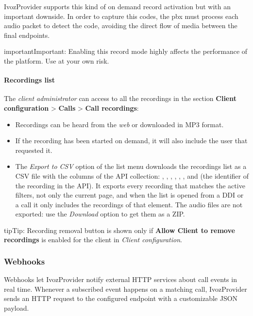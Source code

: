 \documentclass[letterpaper,10pt,english]{sphinxmanual}
\begin{document}
IvozProvider supports this kind of on demand record activation but with an
important downside. In order to capture this codes, the pbx must process each
audio packet to detect the code, avoiding the direct flow of media between the
final endpoints.

\begin{notice}{important}{Important:}
Enabling this record mode highly affects the performance of the
platform. Use at your own risk.
\end{notice}


\paragraph{Recordings list}
\label{administration_portal/client/vpbx/calls/call_recordings:recordings-list}
The \emph{client administrator} can access to all the recordings in the section
\textbf{Client configuration} \textgreater{} \textbf{Calls} \textgreater{} \textbf{Call recordings}:
\begin{itemize}
\item {} 
Recordings can be heard from the \emph{web} or downloaded in MP3 format.

\item {} 
If the recording has been started on demand, it will also include the user
that requested it.

\item {} 
The \emph{Export to CSV} option of the list menu downloads the recordings list as a CSV file with the
columns of the API collection: , , , , ,
,  and  (the identifier of the recording in the API).
It exports every recording that matches the active filters, not only the current page, and
when the list is opened from a DDI or a call it only includes the recordings of that element.
The audio files are not exported: use the \emph{Download} option to get them as a ZIP.

\end{itemize}

\begin{notice}{tip}{Tip:}
Recording removal button is shown only if \textbf{Allow Client to remove recordings} is enabled
for the client in \emph{Client configuration}.
\end{notice}


\subsubsection{Webhooks}
\label{administration_portal/client/vpbx/calls/webhooks:vpbx-webhooks}\label{administration_portal/client/vpbx/calls/webhooks::doc}\label{administration_portal/client/vpbx/calls/webhooks:webhooks}
Webhooks let IvozProvider notify external HTTP services about call events in real time. Whenever a
subscribed event happens on a matching call, IvozProvider sends an HTTP  request to the
configured endpoint with a customizable JSON payload.
\end{document}
